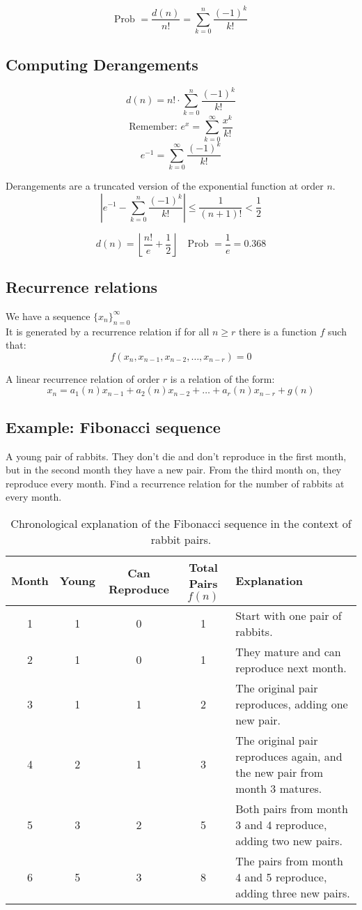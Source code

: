 \documentclass[11pt]{article}
\begin{document}
\[
\text{Prob } = \frac{d(n)}{n!} = \sum_{k=0}^{n} \frac{(-1)^k}{k!}
\]

\subsection*{Computing Derangements}
\[
d(n) = n! \cdot \sum_{k=0}^{n} \frac{(-1)^k}{k!}
\]
\[
\text{Remember: } e^x = \sum_{k=0}^{\infty} \frac{x^k}{k!}
\]
\[
e^{-1} = \sum_{k=0}^{\infty} \frac{(-1)^k}{k!}
\]

Derangements are a truncated version of the exponential function at order $n$.
\[
\left| e^{-1} - \sum_{k=0}^{n} \frac{(-1)^k}{k!} \right| \leq \frac{1}{(n+1)!} < \frac{1}{2}
\]

\[
d(n) = \left\lfloor \frac{n!}{e} + \frac{1}{2} \right\rfloor \quad \text{Prob } = \frac{1}{e} = 0.368 
\]

\subsection{Recurrence relations}
We have a sequence $\{ x_n \}_{n = 0}^{\infty}$ \\
It is generated by a recurrence relation if for all $n \geq r$ there is a function $f$ such that:
\[
f(x_n, x_{n-1}, x_{n-2}, \dots, x_{n-r}) = 0
\]

A linear recurrence relation of order $r$ is a relation of the form:
\[
x_n = a_1(n) x_{n-1} + a_2(n) x_{n-2} + \dots + a_r(n) x_{n-r} + g(n)
\]

\subsection*{Example: Fibonacci sequence}
A young pair of rabbits. They don't die and don't reproduce in the first month, but in the second month they have a new pair. From the third month on, they reproduce every month. Find a recurrence relation for the number of rabbits at every month.

\begin{table}[!ht]
\begin{tabular}{|c|c|c|c|p{5cm}|}
\hline
\textbf{Month} & \textbf{Young} & \textbf{Can Reproduce} & \textbf{Total Pairs} $f(n)$ & \textbf{Explanation} \\
\hline
1 & 1 & 0 & 1 & Start with one pair of rabbits. \\
2 & 1 & 0 & 1 & They mature and can reproduce next month. \\
3 & 1 & 1 & 2 & The original pair reproduces, adding one new pair. \\
4 & 2 & 1 & 3 & The original pair reproduces again, and the new pair from month 3 matures. \\
5 & 3 & 2 & 5 & Both pairs from month 3 and 4 reproduce, adding two new pairs. \\
6 & 5 & 3 & 8 & The pairs from month 4 and 5 reproduce, adding three new pairs. \\
\hline
\end{tabular}
\caption{Chronological explanation of the Fibonacci sequence in the context of rabbit pairs.}
\end{table}
\end{document}

